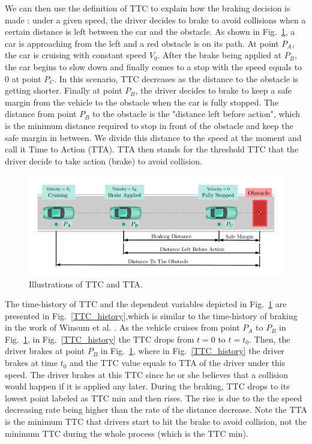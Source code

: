 \documentclass[twocolumn,10pt]{asme2e}
\begin{document}
We can then use the definition of TTC to explain how the braking decision is made : under a given speed, the driver decides to brake to avoid collisions when a certain distance is left between the car and the obstacle. As shown in Fig.~\ref{example_TTC_TTA}, a car is approaching from the left and a red obstacle is on its path. At point $P_A$, the car is cruising with constant speed $V_0$. After the brake being applied at $P_B$, the car begins to slow down and finally comes to a stop with the speed equals to $0$ at point $P_C$. In this scenario, TTC decreases as the distance to the obstacle is getting shorter. Finally at point $P_B$, the driver decides to brake to keep a safe margin from the vehicle to the obstacle when the car is fully stopped. The distance from point $P_B$ to the obstacle is the "distance left before action", which is the minimum distance required to stop in front of the obstacle and keep the safe margin in between. We divide this distance to the speed at the moment and call it Time to Action (TTA). TTA then stands for the threshold TTC that the driver decide to take action (brake) to avoid collision.  


\begin{figure}[htbp!]
\begin{center}
\includegraphics[scale=0.3]{example_TTA_TTC.pdf}
\end{center}
\caption{Illustrations of TTC and TTA.}
\label{example_TTC_TTA} 
\end{figure}


The time-history of TTC and the dependent variables depicted in Fig.~\ref{example_TTC_TTA} are presented in Fig.~\ref{TTC_history},which is similar to the time-history of braking in the work of Winsum et al. \cite{time_history}. As the vehicle cruises from point $P_A$ to $P_B$ in Fig.~\ref{example_TTC_TTA}, in Fig.~\ref{TTC_history} the TTC drops from $t=0$ to $t=t_0$. Then, the driver brakes at point $P_B$ in Fig.~\ref{example_TTC_TTA}, where in Fig.~\ref{TTC_history} the driver brakes at time $t_0$ and the TTC value equals to TTA of the driver under this speed. The driver brakes at this TTC since he or she believes that a collision would happen if it is applied any later. During the braking, TTC drops to its lowest point labeled as TTC min and then rises. The rise is due to the the speed decreasing rate being higher than the rate of the distance decrease. Note the TTA is the minimum TTC that drivers start to hit the brake to avoid collision, not the minimum TTC during the whole process (which is the TTC min).
\end{document}
